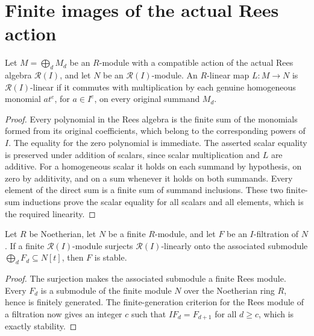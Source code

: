 \section{Finite images of the actual Rees action}

\begin{lemma}
\label{lem:fc-formal-functions-rees-linear}
\leanok
{}
Let $M=\bigoplus_d M_d$ be an $R$-module with a compatible action of the
actual Rees algebra $\mathcal R(I)$, and let $N$ be an
$\mathcal R(I)$-module.  An $R$-linear map $L:M\to N$ is
$\mathcal R(I)$-linear if it commutes with multiplication by each
genuine homogeneous monomial $at^e$, for $a\in I^e$, on every original
summand $M_d$.
\end{lemma}
\begin{proof}
Every polynomial in the Rees algebra is the finite sum of the
monomials formed from its original coefficients, which belong to the
corresponding powers of $I$.  The equality for the zero polynomial is
immediate.  The asserted scalar equality is preserved under addition
of scalars, since scalar multiplication and $L$ are additive.  For a
homogeneous scalar it holds on each summand by hypothesis, on zero by
additivity, and on a sum whenever it holds on both summands.  Every
element of the direct sum is a finite sum of summand inclusions.
These two finite-sum inductions prove the scalar equality for all
scalars and all elements, which is the required linearity.
\end{proof}

\begin{lemma}
\label{lem:fc-formal-functions-rees-finite-image}
\leanok
{}
Let $R$ be Noetherian, let $N$ be a finite $R$-module, and let $F$ be an
$I$-filtration of $N$.  If a finite $\mathcal R(I)$-module surjects
$\mathcal R(I)$-linearly onto the associated submodule
$\bigoplus_d F_d\subseteq N[t]$, then $F$ is stable.
\end{lemma}
\begin{proof}
The surjection makes the associated submodule a finite Rees module.
Every $F_d$ is a submodule of the finite module $N$ over the Noetherian
ring $R$, hence is finitely generated.  The finite-generation criterion
for the Rees module of a filtration now gives an integer $c$ such that
$IF_d=F_{d+1}$ for all $d\geq c$, which is exactly stability.
\end{proof}
